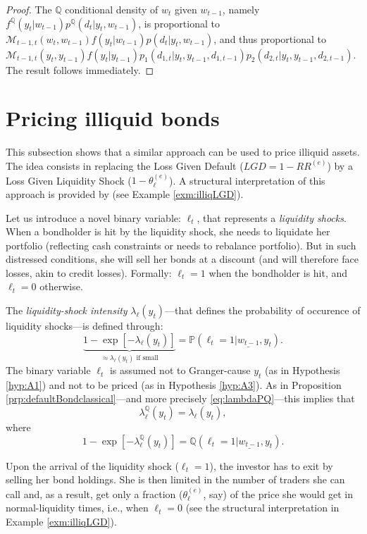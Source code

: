 \documentclass[
  12pt,
]{book}
\theoremstyle{definition}
\theoremstyle{definition}
\theoremstyle{definition}
\theoremstyle{definition}
\theoremstyle{remark}
\begin{document}
\begin{proof}
The \(\mathbb{Q}\) conditional density of \(w_t\) given \(w_{t-1}\), namely \(f^{\mathbb{Q}} (y_t | w_{t-1}) p^{\mathbb{Q}} ( d_t | y_t, w_{t-1} )\), is proportional to \(\mathcal{M}_{t-1, t}( w_t, w_{t-1}) f (y_t | w_{t-1}) p ( d_t | y_t, w_{t-1} )\), and thus proportional to \(\mathcal{M}_{t-1, t}( y_t, y_{t-1}) f (y_t | y_{t-1}) p_1 ( d_{1, t} | y_t, y_{t-1}, d_{1, t-1}) p_2 ( d_{2, t} | y_t, y_{t-1}, d_{2, t-1})\). The result follows immediately.
\end{proof}

\hypertarget{CreditIlliq}{%
\section{Pricing illiquid bonds}\label{CreditIlliq}}

This subsection shows that a similar approach can be used to price illiquid assets. The idea consists in replacing the Loss Given Default (\(LGD = 1-RR^{(e)}\)) by a Loss Given Liquidity Shock (\(1-\theta_\ell^{(e)}\)). A structural interpretation of this approach is provided by \citet{Ericsson_Renault_2006} (see Example \ref{exm:illiqLGD}).

Let us introduce a novel binary variable: \(\ell_t\), that represents a \emph{liquidity shocks}. When a bondholder is hit by the liquidity shock, she needs to liquidate her portfolio (reflecting cash constraints or needs to rebalance portfolio). But in such distressed conditions, she will sell her bonds at a discount (and will therefore face losses, akin to credit losses). Formally: \(\ell_{t}=1\) when the bondholder is hit, and \(\ell_{t}=0\) otherwise.

The \emph{liquidity-shock intensity} \(\lambda_\ell(y_t)\)---that defines the probability of occurence of liquidity shocks---is defined through:
\[
\underbrace{1- \exp[-\lambda_\ell(y_t)]}_{\approx \lambda_\ell(y_t)\mbox{ if small}} = \mathbb{P}(\ell_t = 1|\underline{w_{t-1}},y_t).
\]
The binary variable \(\ell_t\) is assumed not to Granger-cause \(y_t\) (as in Hypothesis \ref{hyp:A1}) and not to be priced (as in Hypothesis \ref{hyp:A3}). As in Proposition \ref{prp:defaultBondclassical}---and more precisely \eqref{eq:lambdaPQ}---this implies that
\[
\lambda_\ell^{\mathbb{Q}}(y_t) = \lambda_\ell(y_t),
\]
where
\[
1- \exp[-\lambda^{\mathbb{Q}}_\ell(y_t)] = \mathbb{Q}(\ell_t = 1|\underline{w_{t-1}},y_t).
\]

Upon the arrival of the liquidity shock (\(\ell_{t}=1\)), the investor has to exit by selling her bond holdings. She is then limited in the number of traders she can call and, as a result, get only a fraction (\(\theta_\ell^{(e)}\), say) of the price she would get in normal-liquidity times, i.e., when \(\ell_{t}=0\) (see the structural interpretation in Example \ref{exm:illiqLGD}).
\end{document}
